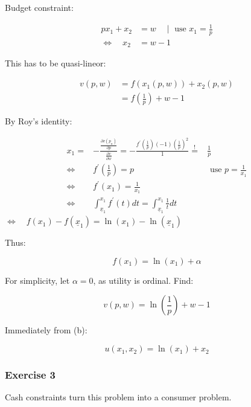 {{\begin{enumerate}[label=(\alph*)]
{\item 
Budget constraint:

$$
\begin{aligned}
p x_{1}+x_{2} & =w \quad \mid \text { use } x_{1}=\frac{1}{p} \\
\Leftrightarrow \quad x_{2} & =w-1
\end{aligned}
$$
}
{\item 
This has to be quasi-lineor:

$$
\begin{aligned}
v(p, w) & =f\left(x_{1}(p, w)\right)+x_{2}(p, w) \\
& =f\left(\frac{1}{p}\right)+w-1
\end{aligned}
$$

By Roy's identity:

$$
\begin{array}{lcl}
x_{1}= & -\frac{\frac{\partial v\left(p_{n}\right)}{\partial p}}{\frac{\partial v}{\partial w}}=-\frac{f^{\prime}\left(\frac{1}{p}\right)(-1)\left(\frac{1}{p}\right)^{2}}{1} \stackrel{!}{=} & \frac{1}{p} \\
\Leftrightarrow & f^{\prime}\left(\frac{1}{p}\right)=p & \text { use } p=\frac{1}{x_{1}} \\
\Leftrightarrow & f^{\prime}\left(x_{1}\right)=\frac{1}{x_{1}} \\
\Leftrightarrow & \int_{\underline{x}_{1}}^{x_{1}} f^{\prime}(t) d t=\int_{\underline{x}_{1}}^{x_{1}} \frac{1}{t} d t
\end{array}
$$
$\Longleftrightarrow \quad f\left(x_{1}\right)-f\left(\underline{x}_{1}\right)=\ln \left(x_{1}\right)-\ln \left(\underline{x}_{1}\right)$

Thus:

$$
f\left(x_{1}\right)=\ln \left(x_{1}\right)+\alpha
$$

For simplicity, let $\alpha=0$, as utility is ordinal. Find:

$$
v(p, w)=\ln \left(\frac{1}{p}\right)+w-1
$$
}
{\item 
 Immediately from (b):

$$
u\left(x_{1}, x_{2}\right)=\ln \left(x_{1}\right)+x_{2}
$$
}
\end{enumerate}
}
{
\subsubsection*{Exercise 3}

Cash constraints turn this problem into a consumer problem.

}}
